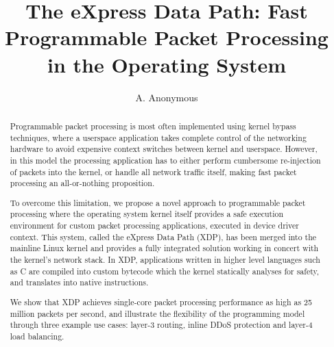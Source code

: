\documentclass[10pt,sigconf]{acmart}
\begin{document}
\title{The eXpress Data Path: Fast Programmable Packet Processing in the
  Operating System}
%
%
%
%
%
%
%
\author{A. Anonymous}

\renewcommand{\shorttitle}{The eXpress Data Path}
\captionsetup{font+=small}

\begin{abstract}
  Programmable packet processing is most often implemented using kernel bypass
  techniques, where a userspace application takes complete control of the
  networking hardware to avoid expensive context switches between kernel and
  userspace. However, in this model the processing application has to either
  perform cumbersome re-injection of packets into the kernel, or handle all
  network traffic itself, making fast packet processing an all-or-nothing
  proposition.

  To overcome this limitation, we propose a novel approach to programmable
  packet processing where the operating system kernel itself provides a safe
  execution environment for custom packet processing applications, executed in
  device driver context. This system, called the eXpress Data Path (XDP), has
  been merged into the mainline Linux kernel and provides a fully integrated
  solution working in concert with the kernel's network stack. In XDP,
  applications written in higher level languages such as C are compiled into
  custom bytecode which the kernel statically analyses for safety, and
  translates into native instructions.

  We show that XDP achieves single-core packet processing performance as high as
  25 million packets per second, and illustrate the flexibility of the
  programming model through three example use cases: layer-3 routing, inline
  DDoS protection and layer-4 load balancing.
\end{abstract}
\end{document}

